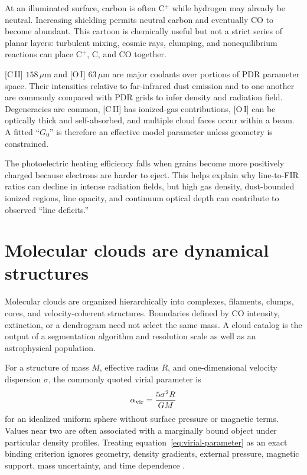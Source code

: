At an illuminated surface, carbon is often C$^+$ while hydrogen may already be
neutral.  Increasing shielding permits neutral carbon and eventually CO to become
abundant.  This cartoon is chemically useful but not a strict series of planar
layers: turbulent mixing, cosmic rays, clumping, and nonequilibrium reactions can
place C$^+$, C, and CO together.

[C\,II] $158\,\mu$m and [O\,I] $63\,\mu$m are major coolants over portions of PDR
parameter space.  Their intensities relative to far-infrared dust emission and to one
another are commonly compared with PDR grids to infer density and radiation field.
Degeneracies are common, [C\,II] has ionized-gas contributions, [O\,I] can be optically
thick and self-absorbed, and multiple cloud faces occur within a beam.  A fitted
``$G_0$'' is therefore an effective model parameter unless geometry is constrained.

The photoelectric heating efficiency falls when grains become more positively
charged because electrons are harder to eject.  This helps explain why line-to-FIR
ratios can decline in intense radiation fields, but high gas density, dust-bounded
ionized regions, line opacity, and continuum optical depth can contribute to observed
``line deficits.''

\section{Molecular clouds are dynamical structures}

Molecular clouds are organized hierarchically into complexes, filaments, clumps,
cores, and velocity-coherent structures.  Boundaries defined by CO intensity,
extinction, or a dendrogram need not select the same mass.  A cloud catalog is the
output of a segmentation algorithm and resolution scale as well as an astrophysical
population.

For a structure of mass $M$, effective radius $R$, and one-dimensional velocity
dispersion $\sigma$, the commonly quoted virial parameter is
\begin{equation}
 \alpha_{\rm vir}=\frac{5\sigma^2R}{GM}
 \label{eq:virial-parameter}
\end{equation}
for an idealized uniform sphere without surface pressure or magnetic terms.  Values
near two are often associated with a marginally bound object under particular density
profiles.  Treating equation~\eqref{eq:virial-parameter} as an exact binding criterion
ignores geometry, density gradients, external pressure, magnetic support, mass
uncertainty, and time dependence \citep{McKeeOstriker2007}.

